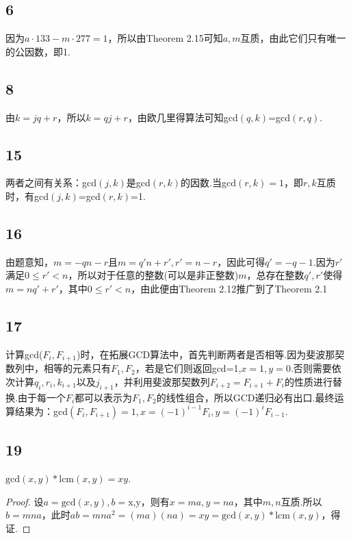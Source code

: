 \documentclass[twocolumn]{article}
\newenvironment{SChinese}{
	\CJKfamily{gbsn}
	\CJKtilde
	\CJKnospace}{}
\begin{document}
\begin{CJK}{UTF8}{}
\begin{SChinese}
				\subsection*{6}
					因为$a\cdot133-m\cdot277=1$，所以由Theorem 2.15可知$a,m$互质，由此它们只有唯一的公因数，即1.
				\subsection*{8}
					由$k=jq+r$，所以$k=qj+r$，由欧几里得算法可知gcd$(q,k)$=gcd$(r,q)$.
				\subsection*{15}
					两者之间有关系：gcd$(j,k)$是gcd$(r,k)$的因数.当gcd$(r,k)=1$，即$r,k$互质时，有gcd$(j,k)$=gcd$(r,k)$=1.
				\subsection*{16}
					由题意知，$m=-qn-r$且$m=q'n+r',r'=n-r$，因此可得$q'=-q-1$.因为$r'$满足$0\le r'< n$，所以对于任意的整数(可以是非正整数)$m$，总存在整数$q',r'$使得$m=nq'+r'$，其中$0\le r'<n$，由此便由Theorem 2.12推广到了Theorem 2.1
				\subsection*{17}
					计算gcd($F_i,F_{i+1}$)时，在拓展GCD算法中，首先判断两者是否相等.因为斐波那契数列中，相等的元素只有$F_1,F_2$，若是它们则返回gcd=1,$x=1,y=0$.否则需要依次计算$q_i,r_i,k_{i+1}$以及$j_{i+1}$，并利用斐波那契数列$F_{i+2}=F_{i+1}+F_i$的性质进行替换.由于每一个$F_i$都可以表示为$F_1,F_2$的线性组合，所以GCD递归必有出口.最终运算结果为：gcd$(F_i,F_{i+1})=1,x=(-1)^{i-1}F_i,y=(-1)^iF_{i-1}$.
				\subsection*{19}
					$\textrm{gcd}(x,y)*\textrm{lcm}(x,y)=xy$.
					\begin{proof}
						设$a=\textrm{gcd}(x,y),b=\textrm{x,y}$，则有$x=ma,y=na$，其中$m,n$互质.所以$b=mna$，此时$ab=mna^2=(ma)(na)=xy=\textrm{gcd}(x,y)*\textrm{lcm}(x,y)$，得证.
					\end{proof}
		\end{SChinese}
	\end{CJK}
\end{document}
